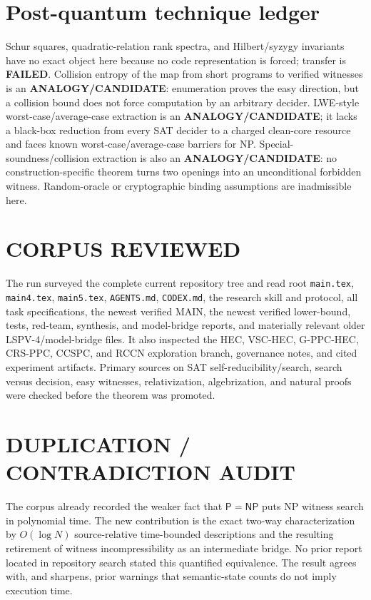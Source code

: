 \documentclass[11pt]{article}
\begin{document}
\section{Post-quantum technique ledger}

Schur squares, quadratic-relation rank spectra, and Hilbert/syzygy invariants have no exact object here because no code representation is forced; transfer is \textbf{FAILED}.  Collision entropy of the map from short programs to verified witnesses is an \textbf{ANALOGY/CANDIDATE}: enumeration proves the easy direction, but a collision bound does not force computation by an arbitrary decider.  LWE-style worst-case/average-case extraction is an \textbf{ANALOGY/CANDIDATE}; it lacks a black-box reduction from every SAT decider to a charged clean-core resource and faces known worst-case/average-case barriers for NP.  Special-soundness/collision extraction is also an \textbf{ANALOGY/CANDIDATE}: no construction-specific theorem turns two openings into an unconditional forbidden witness.  Random-oracle or cryptographic binding assumptions are inadmissible here.

\section{CORPUS REVIEWED}

The run surveyed the complete current repository tree and read root \texttt{main.tex}, \texttt{main4.tex}, \texttt{main5.tex}, \texttt{AGENTS.md}, \texttt{CODEX.md}, the research skill and protocol, all task specifications, the newest verified MAIN, the newest verified lower-bound, tests, red-team, synthesis, and model-bridge reports, and materially relevant older LSPV-4/model-bridge files.  It also inspected the HEC, VSC-HEC, G-PPC-HEC, CRS-PPC, CCSPC, and RCCN exploration branch, governance notes, and cited experiment artifacts.  Primary sources on SAT self-reducibility/search, search versus decision, easy witnesses, relativization, algebrization, and natural proofs were checked before the theorem was promoted.

\section{DUPLICATION / CONTRADICTION AUDIT}

The corpus already recorded the weaker fact that $\mathsf P=\mathsf{NP}$ puts NP witness search in polynomial time.  The new contribution is the exact two-way characterization by $O(\log N)$ source-relative time-bounded descriptions and the resulting retirement of witness incompressibility as an intermediate bridge.  No prior report located in repository search stated this quantified equivalence.  The result agrees with, and sharpens, prior warnings that semantic-state counts do not imply execution time.
\end{document}
